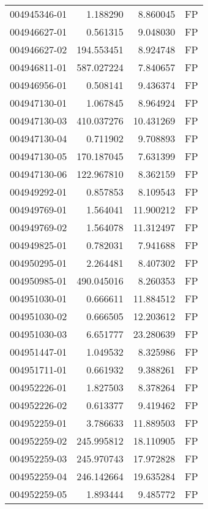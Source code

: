 \begin{tabular}{lrrl}
004945346-01 &    1.188290 &       8.860045 &   FP \\
004946627-01 &    0.561315 &       9.048030 &   FP \\
004946627-02 &  194.553451 &       8.924748 &   FP \\
004946811-01 &  587.027224 &       7.840657 &   FP \\
004946956-01 &    0.508141 &       9.436374 &   FP \\
004947130-01 &    1.067845 &       8.964924 &   FP \\
004947130-03 &  410.037276 &      10.431269 &   FP \\
004947130-04 &    0.711902 &       9.708893 &   FP \\
004947130-05 &  170.187045 &       7.631399 &   FP \\
004947130-06 &  122.967810 &       8.362159 &   FP \\
004949292-01 &    0.857853 &       8.109543 &   FP \\
004949769-01 &    1.564041 &      11.900212 &   FP \\
004949769-02 &    1.564078 &      11.312497 &   FP \\
004949825-01 &    0.782031 &       7.941688 &   FP \\
004950295-01 &    2.264481 &       8.407302 &   FP \\
004950985-01 &  490.045016 &       8.260353 &   FP \\
004951030-01 &    0.666611 &      11.884512 &   FP \\
004951030-02 &    0.666505 &      12.203612 &   FP \\
004951030-03 &    6.651777 &      23.280639 &   FP \\
004951447-01 &    1.049532 &       8.325986 &   FP \\
004951711-01 &    0.661932 &       9.388261 &   FP \\
004952226-01 &    1.827503 &       8.378264 &   FP \\
004952226-02 &    0.613377 &       9.419462 &   FP \\
004952259-01 &    3.786633 &      11.889503 &   FP \\
004952259-02 &  245.995812 &      18.110905 &   FP \\
004952259-03 &  245.970743 &      17.972828 &   FP \\
004952259-04 &  246.142664 &      19.635284 &   FP \\
004952259-05 &    1.893444 &       9.485772 &   FP \\

\end{tabular}
